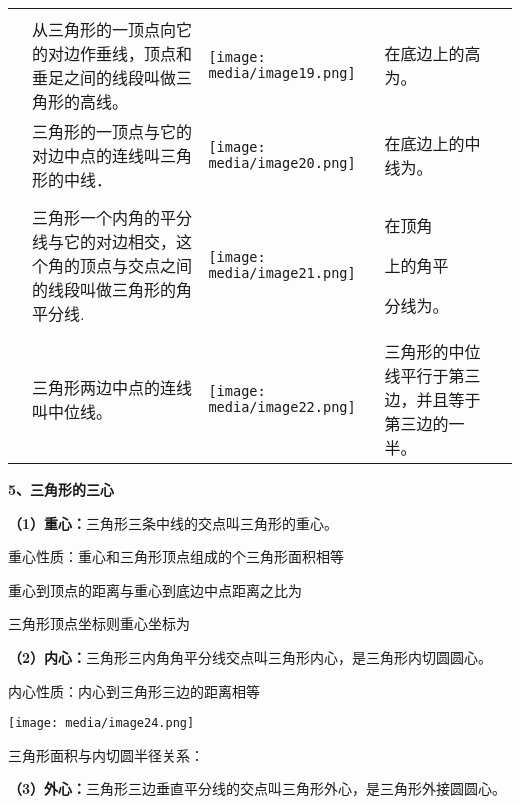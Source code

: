 \documentclass[a4paper,11pt,UTF8]{ctexart}
\begin{document}
\begin{longtable}[]{@{}lllll@{}}
\toprule
\endhead
& & & &\tabularnewline
&
从三角形的一顶点向它的对边作垂线，顶点和垂足之间的线段叫做三角形的高线。
& \texttt{[image: media/image19.png]}
& 在底边上的高为。 &\tabularnewline
& 三角形的一顶点与它的对边中点的连线叫三角形的中线． &
\texttt{[image: media/image20.png]} &
在底边上的中线为。 &\tabularnewline
\begin{minipage}[t]{0.17\columnwidth}\raggedright
\strut
\end{minipage} & \begin{minipage}[t]{0.17\columnwidth}\raggedright
三角形一个内角的平分线与它的对边相交，这个角的顶点与交点之间的线段叫做三角形的角平分线.\strut
\end{minipage} & \begin{minipage}[t]{0.17\columnwidth}\raggedright
\texttt{[image: media/image21.png]}\strut
\end{minipage} & \begin{minipage}[t]{0.17\columnwidth}\raggedright
在顶角

上的角平

分线为。\strut
\end{minipage} & \begin{minipage}[t]{0.17\columnwidth}\raggedright
\strut
\end{minipage}\tabularnewline
& 三角形两边中点的连线叫中位线。 &
\texttt{[image: media/image22.png]} &
三角形的中位线平行于第三边，并且等于第三边的一半。 &\tabularnewline
\bottomrule
\end{longtable}

\textbf{5、三角形的三心}

\textbf{（1）重心：}三角形三条中线的交点叫三角形的重心。

重心性质：重心和三角形顶点组成的个三角形面积相等

重心到顶点的距离与重心到底边中点距离之比为

三角形顶点坐标则重心坐标为

\textbf{（2）内心：}三角形三内角角平分线交点叫三角形内心，是三角形内切圆圆心。

内心性质：内心到三角形三边的距离相等

\texttt{[image: media/image24.png]}

三角形面积与内切圆半径关系：

\textbf{（3）外心：}三角形三边垂直平分线的交点叫三角形外心，是三角形外接圆圆心。
\end{document}
